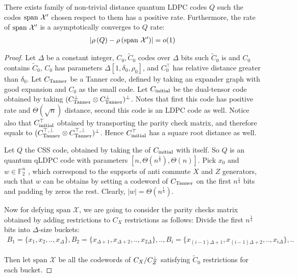 \documentclass[manuscript,screen,review]{acmart}
\begin{document}
\begin{claim}
  There exists family of non-trivial distance quantum LDPC codes $Q$ such the codes $\text{span }\mathcal{X}^\prime$ chosen respect to them has a positive rate. Furthermore, the rate of $\text{span }\mathcal{X}^\prime$ is a asymptotically converges to $Q$ rate:
  \begin{equation*}
    \begin{split}
      \left| \rho\left(Q\right) - \rho\left(\text{span }\mathcal{X}^\prime\right) \right| = o(1)
    \end{split}
  \end{equation*}
\end{claim}
\begin{proof}
  Let $\Delta$ be a constant integer, $C_{0},\tilde{C}_{0}$ codes over $\Delta$ bits such $\tilde{C}_{0}$ is \trig and $C_{0}$ contains $\tilde{C}_{0}$, $C_{0}$ has parameters $\Delta[1,\delta_{0},\rho_{0}]$, and $C_{0}^\top$ has relative distance greater than $\delta_{0}$. Let $C_{\text{Tanner}}$ be a Tanner code, defined by taking an expander graph with good expansion and $C_{0}$ as the small code. Let $C_{\text{initial}}$ be the dual-tensor code obtained by taking $(C_{\text{Tanner}}^\perp \otimes C_{\text{Tanner}}^\perp )^\perp$. Notes that first this code has positive rate and $\Theta(\sqrt{n})$ distance, second this code is an LDPC code as well. Notice also that $C_{\text{initial}}^{\top}$ obtained by transporting the parity check matrix, and therefore equals to  $(C_{\text{Tanner}}^{\top, \perp} \otimes C_{\text{Tanner}}^{\top, \perp} )^\perp$. Hence $C_{\text{initial}}^{\top}$ has a square root distance as well.

  Let $Q$ the CSS code, obtained by taking the \Hyp of $C_{\text{initial}}$ with itself. So $Q$ is an quantum qLDPC code with parameters $[n, \Theta(n^{\frac{1}{4}}), \Theta(n)]$. Pick $x_{0}$ and $w \in \mathbb{F}_{2}^{n}$ , which correspond to the supports of anti commute $X$ and $Z$ generators, such that $w$ can be obtains by setting a codeword of $C_{\text{Tanner}}$ on the first $n^{\frac{1}{4}}$ bits and padding by zeros the rest. Clearly, $|w| = \Theta(n^{\frac{1}{4}})$.

  Now for defying $\text{span }\mathcal{X}$, we are going to consider the parity checks matrix obtained by adding restrictions to $C_{X}$ restrictions as follows: Divide the first $n^{\frac{1}{4}}$ bits into $\Delta$-size buckets: 
  \begin{equation*}
    \begin{split}
      B_{1} = \{x_{1}, x_{2}, ..,x_{\Delta}\}, B_{2} = \{x_{\Delta + 1}, x_{\Delta + 2}, ..,x_{2\Delta}\}, .., B_{i} = \{x_{(i-1)\Delta + 1}, x_{(i-1)\Delta + 2}, ..,x_{i\Delta}\}, .. 
    \end{split}
  \end{equation*}

   Then let $\text{span }\mathcal{X}$ be all the codewords of $C_{X}/C_{Z}^\perp$ satisfying $\tilde{C}_{0}$ restrictions for each bucket.
\end{proof}
\end{document}
